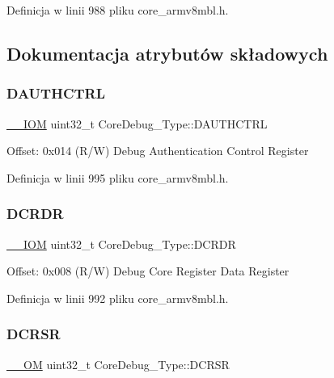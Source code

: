 Definicja w linii 988 pliku core\+\_\+armv8mbl.\+h.



\subsection{Dokumentacja atrybutów składowych}
\mbox{\label{struct_core_debug___type_a1b319a8279b9ff2572ab5391dba5bb88}} 
\subsubsection{\texorpdfstring{D\+A\+U\+T\+H\+C\+T\+RL}{DAUTHCTRL}}
{\footnotesize\ttfamily \hyperlink{core__sc300_8h_ab6caba5853a60a17e8e04499b52bf691}{\+\_\+\+\_\+\+I\+OM} uint32\+\_\+t Core\+Debug\+\_\+\+Type\+::\+D\+A\+U\+T\+H\+C\+T\+RL}

Offset\+: 0x014 (R/W) Debug Authentication Control Register 

Definicja w linii 995 pliku core\+\_\+armv8mbl.\+h.

\mbox{\label{struct_core_debug___type_aab3cc92ef07bc1f04b3a3aa6db2c2d55}} 
\subsubsection{\texorpdfstring{D\+C\+R\+DR}{DCRDR}}
{\footnotesize\ttfamily \hyperlink{core__sc300_8h_ab6caba5853a60a17e8e04499b52bf691}{\+\_\+\+\_\+\+I\+OM} uint32\+\_\+t Core\+Debug\+\_\+\+Type\+::\+D\+C\+R\+DR}

Offset\+: 0x008 (R/W) Debug Core Register Data Register 

Definicja w linii 992 pliku core\+\_\+armv8mbl.\+h.

\mbox{\label{struct_core_debug___type_af907cf64577eaf927dac6787df6dd98b}} 
\subsubsection{\texorpdfstring{D\+C\+R\+SR}{DCRSR}}
{\footnotesize\ttfamily \hyperlink{core__sc300_8h_a0ea2009ed8fd9ef35b48708280fdb758}{\+\_\+\+\_\+\+OM} uint32\+\_\+t Core\+Debug\+\_\+\+Type\+::\+D\+C\+R\+SR}

